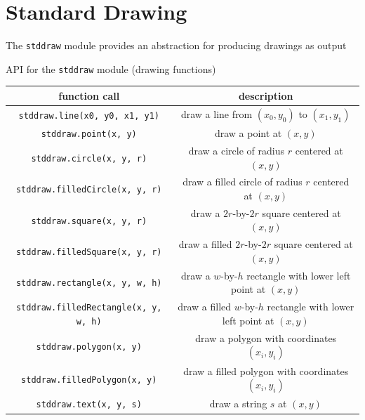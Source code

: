 \documentclass[8pt,a4paper,compress]{beamer}
\begin{document}
\section{Standard Drawing}
\begin{frame}[fragile]
\pause

The \lstinline{stddraw} module provides an abstraction for producing drawings as output

\pause
\bigskip

API for the \lstinline{stddraw} module (drawing functions)
\begin{center}
\begin{tabular}{cc}
function call & description \\ \hline
\lstinline$stddraw.line(x0, y0, x1, y1)$ & draw a line from $(x_0, y_0)$ to $(x_1, y_1)$ \\
\lstinline$stddraw.point(x, y)$ & draw a point at $(x, y)$ \\
\lstinline$stddraw.circle(x, y, r)$ & draw a circle of radius $r$ centered at $(x, y)$ \\
\lstinline$stddraw.filledCircle(x, y, r)$ & draw a filled circle of radius $r$ centered at $(x, y)$ \\
\lstinline$stddraw.square(x, y, r)$ & draw a $2r$-by-$2r$ square centered at $(x, y)$ \\
\lstinline$stddraw.filledSquare(x, y, r)$ & draw a filled $2r$-by-$2r$ square centered at $(x, y)$ \\
\lstinline$stddraw.rectangle(x, y, w, h)$ & \makecell{draw a $w$-by-$h$ rectangle \\ with lower left point at $(x, y)$} \\ 
\lstinline$stddraw.filledRectangle(x, y, w, h)$ & \makecell{draw a filled $w$-by-$h$ rectangle \\ with lower left point at $(x, y)$} \\
\lstinline$stddraw.polygon(x, y)$ & draw a polygon with coordinates $(x_i, y_i)$ \\
\lstinline$stddraw.filledPolygon(x, y)$ & draw a filled polygon with coordinates $(x_i, y_i)$ \\
\lstinline$stddraw.text(x, y, s)$ & draw a string $s$ at $(x, y)$ \\
\end{tabular} 
\end{center}
\end{frame}
\end{document}
